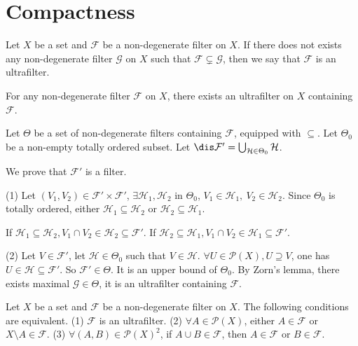 \section{Compactness}
\begin{definitionenv}
    Let $X$ be a set and $\mathcal{F}$ be a non-degenerate filter on $X$. If there does not exists any non-degenerate filter $\mathcal{G}$ on $X$ such that $\mathcal{F}\subsetneq\mathcal{G}$, then we say that $\mathcal{F}$ is an ultrafilter.
\end{definitionenv}
\begin{propositionenv}
    For any non-degenerate filter $\mathcal{F}$ on $X$, there exists an ultrafilter on $X$ containing $\mathcal{F}$.
\end{propositionenv}
\begin{proofenv}
    Let $\Theta$ be a set of non-degenerate filters containing $\mathcal{F}$, equipped with $\subseteq$. Let $\Theta_0$ be a non-empty totally ordered subset. Let $\dis \mathcal{F}'=\bigcup_{\mathcal{H}\in\Theta_0}\mathcal{H}$.
    
    We prove that $\mathcal{F}'$ is a filter.

    (1) Let $(V_1,V_2)\in \mathcal{F}'\times\mathcal{F}'$, $\exists \mathcal{H}_1,\mathcal{H}_2$ in $\Theta_0$, $V_1\in\mathcal{H}_1,\ V_2\in \mathcal{H}_2$. Since $\Theta_0$ is totally ordered, either $\mathcal{H}_1\subseteq\mathcal{H}_2$ or $\mathcal{H}_2\subseteq\mathcal{H}_1$. 

    If $\mathcal{H}_1\subseteq \mathcal{H}_2, V_1\cap V_2\in \mathcal{H}_2\subseteq\mathcal{F}'$. If $\mathcal{H}_2\subseteq\mathcal{H}_1,V_1\cap V_2\in \mathcal{H}_1\subseteq\mathcal{F}'$.

    (2) Let $V\in \mathcal{F}'$, let $\mathcal{H}\in \Theta_0$ such that $V\in \mathcal{H}$. $\forall U\in \mathscr{P}(X), U\supseteq V$, one has $U\in \mathcal{H}\subseteq\mathcal{F}'$. So $\mathcal{F}'\in \Theta$. It is an upper bound of $\Theta_0$. By Zorn's lemma, there exists maximal $\mathcal{G}\in \Theta$, it is an ultrafilter containing $\mathcal{F}$.

\end{proofenv}
\begin{propositionenv}
    Let $X$ be a set and $\mathcal{F}$ be a non-degenerate filter on $X$. The following conditions are equivalent.
    \newline
    (1) $\mathcal{F}$ is an ultrafilter.
    \newline
    (2) $\forall A\in \mathscr{P}(X)$, either $A\in \mathcal{F}$ or $X\setminus A\in \mathcal{F}$.
    \newline
    (3) $\forall (A,B)\in \mathscr{P}(X)^2$, if $A\cup B\in \mathcal{F}$, then $A\in \mathcal{F}$ or $B\in\mathcal{F}$.
\end{propositionenv}
